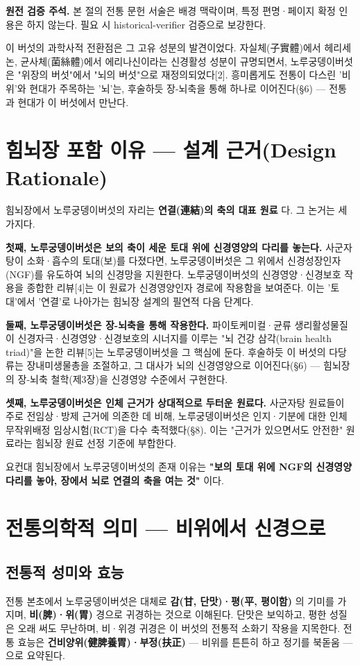 \documentclass[11pt,oneside]{book}
\newenvironment{authnote}
  {\par\smallskip\begingroup\leftskip=7mm\rightskip=5mm\small\color{muted}\noindent\ignorespaces}
  {\par\endgroup\smallskip}
\begin{document}
\begin{authnote}\textbf{원전 검증 주석.} 본 절의 전통 문헌 서술은 배경 맥락이며, 특정 편명·페이지 확정 인용은 하지 않는다. 필요 시 historical-verifier 검증으로 보강한다.\end{authnote}
이 버섯의 과학사적 전환점은 그 고유 성분의 발견이었다. 자실체(子實體)에서 헤리세논, 균사체(菌絲體)에서 에리나신이라는 신경활성 성분이 규명되면서, 노루궁뎅이버섯은 "위장의 버섯"에서 "뇌의 버섯"으로 재정의되었다[2]. 흥미롭게도 전통이 다스린 '비위'와 현대가 주목하는 '뇌'는, 후술하듯 장-뇌축을 통해 하나로 이어진다(§6) — 전통과 현대가 이 버섯에서 만난다.

\section{힘뇌장 포함 이유 — 설계 근거(Design Rationale)}
힘뇌장에서 노루궁뎅이버섯의 자리는 \textbf{연결(連結)의 축의 대표 원료} 다. 그 논거는 세 가지다.

\textbf{첫째, 노루궁뎅이버섯은 보의 축이 세운 토대 위에 신경영양의 다리를 놓는다.} 사군자탕이 소화·흡수의 토대(보)를 다졌다면, 노루궁뎅이버섯은 그 위에서 신경성장인자(NGF)를 유도하여 뇌의 신경망을 지원한다. 노루궁뎅이버섯의 신경영양·신경보호 작용을 종합한 리뷰[4]는 이 원료가 신경영양인자 경로에 작용함을 보여준다. 이는 '토대'에서 '연결'로 나아가는 힘뇌장 설계의 필연적 다음 단계다.

\textbf{둘째, 노루궁뎅이버섯은 장-뇌축을 통해 작용한다.} 파이토케미컬·균류 생리활성물질이 신경자극·신경영양·신경보호의 시너지를 이루는 "뇌 건강 삼각(brain health triad)"을 논한 리뷰[5]는 노루궁뎅이버섯을 그 핵심에 둔다. 후술하듯 이 버섯의 다당류는 장내미생물총을 조절하고, 그 대사가 뇌의 신경영양으로 이어진다(§6) — 힘뇌장의 장-뇌축 철학(제3장)을 신경영양 수준에서 구현한다.

\textbf{셋째, 노루궁뎅이버섯은 인체 근거가 상대적으로 두터운 원료다.} 사군자탕 원료들이 주로 전임상·방제 근거에 의존한 데 비해, 노루궁뎅이버섯은 인지·기분에 대한 인체 무작위배정 임상시험(RCT)을 다수 축적했다(§8). 이는 "근거가 있으면서도 안전한" 원료라는 힘뇌장 원료 선정 기준에 부합한다.

요컨대 힘뇌장에서 노루궁뎅이버섯의 존재 이유는 \textbf{"보의 토대 위에 NGF의 신경영양 다리를 놓아, 장에서 뇌로 연결의 축을 여는 것"} 이다.

\section{전통의학적 의미 — 비위에서 신경으로}
\subsection{전통적 성미와 효능}
전통 본초에서 노루궁뎅이버섯은 대체로 \textbf{감(甘, 단맛)·평(平, 평이함)} 의 기미를 가지며, \textbf{비(脾)·위(胃)} 경으로 귀경하는 것으로 이해된다. 단맛은 보익하고, 평한 성질은 오래 써도 무난하며, 비·위경 귀경은 이 버섯의 전통적 소화기 작용을 지목한다. 전통 효능은 \textbf{건비양위(健脾養胃)·부정(扶正)} — 비위를 튼튼히 하고 정기를 북돋움 — 으로 요약된다.
\end{document}
